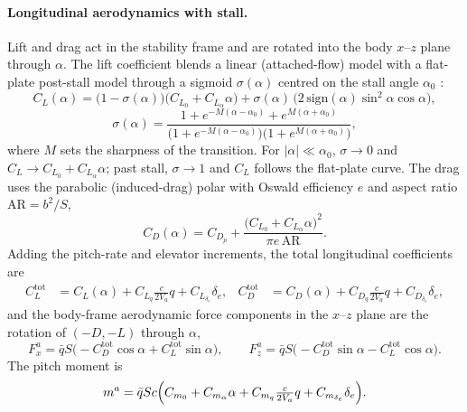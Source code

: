 \paragraph{Longitudinal aerodynamics with stall.} Lift and drag act in the
stability frame and are rotated into the body $x$--$z$ plane through $\alpha$. The
lift coefficient blends a linear (attached-flow) model with a flat-plate
post-stall model through a sigmoid $\sigma(\alpha)$ centred on the stall angle
$\alpha_0$ \cite{beard2012small}:
\begin{equation}
C_L(\alpha)=\bigl(1-\sigma(\alpha)\bigr)\bigl(C_{L_0}+C_{L_\alpha}\alpha\bigr)
+\sigma(\alpha)\,\bigl(2\,\mathrm{sign}(\alpha)\sin^2\!\alpha\cos\alpha\bigr),
\label{eq:CL}
\end{equation}
\begin{equation}
\sigma(\alpha)=\frac{1+e^{-M(\alpha-\alpha_0)}+e^{M(\alpha+\alpha_0)}}
{\bigl(1+e^{-M(\alpha-\alpha_0)}\bigr)\bigl(1+e^{M(\alpha+\alpha_0)}\bigr)},
\label{eq:sigma}
\end{equation}
where $M$ sets the sharpness of the transition. For $|\alpha|\ll\alpha_0$,
$\sigma\to0$ and $C_L\to C_{L_0}+C_{L_\alpha}\alpha$; past stall, $\sigma\to1$ and
$C_L$ follows the flat-plate curve. The drag uses the parabolic (induced-drag)
polar with Oswald efficiency $e$ and aspect ratio $\mathrm{AR}=b^2/S$,
\begin{equation}
C_D(\alpha)=C_{D_p}+\frac{\bigl(C_{L_0}+C_{L_\alpha}\alpha\bigr)^2}{\pi e\,\mathrm{AR}}.
\label{eq:CD}
\end{equation}
Adding the pitch-rate and elevator increments, the total longitudinal
coefficients are
\begin{align}
C_L^{\mathrm{tot}}&=C_L(\alpha)+C_{L_q}\tfrac{c}{2V_a}q+C_{L_{\delta_e}}\delta_e,&
C_D^{\mathrm{tot}}&=C_D(\alpha)+C_{D_q}\tfrac{c}{2V_a}q+C_{D_{\delta_e}}\delta_e,
\end{align}
and the body-frame aerodynamic force components in the $x$--$z$ plane are the
rotation of $(-D,-L)$ through $\alpha$,
\begin{equation}
F_x^{a}=\bar qS\bigl(-C_D^{\mathrm{tot}}\cos\alpha+C_L^{\mathrm{tot}}\sin\alpha\bigr),
\qquad
F_z^{a}=\bar qS\bigl(-C_D^{\mathrm{tot}}\sin\alpha-C_L^{\mathrm{tot}}\cos\alpha\bigr).
\label{eq:fw-fxfz}
\end{equation}
The pitch moment is
\begin{equation}
m^{a}=\bar qSc\Bigl(C_{m_0}+C_{m_\alpha}\alpha+C_{m_q}\tfrac{c}{2V_a}q
+C_{m_{\delta_e}}\delta_e\Bigr).
\label{eq:fw-m}
\end{equation}

